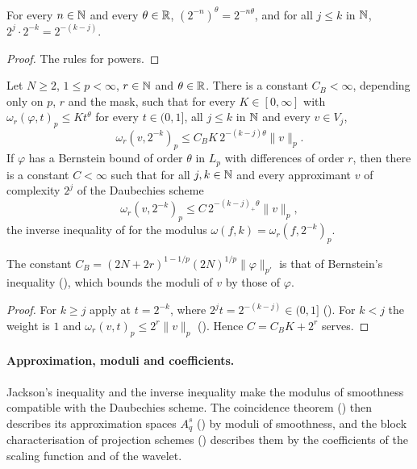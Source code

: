 \begin{lemma}
\label{lem:daub-dyadic-scales}
\leanok
For every $n \in \mathbb{N}$ and every $\theta \in \mathbb{R}$, $(2^{-n})^\theta = 2^{-n\theta}$, and for all
$j \leq k$ in $\mathbb{N}$, $2^j \cdot 2^{-k} = 2^{-(k-j)}$.
\end{lemma}

\begin{proof}
\leanok
The rules for powers.
\end{proof}

\begin{corollary}
\label{cor:daub-inverse}
\leanok
{}
Let $N \geq 2$, $1 \leq p < \infty$, $r \in \mathbb{N}$ and $\theta \in \mathbb{R}$. There is a constant
$C_B < \infty$, depending only on $p$, $r$ and the mask, such that for every $K \in [0, \infty]$
with $\omega_r(\varphi, t)_p \leq K t^\theta$ for every $t \in (0, 1]$, all $j \leq k$ in $\mathbb{N}$
and every $v \in V_j$,
\[
  \omega_r(v, 2^{-k})_p \leq C_B K \, 2^{-(k-j)\theta} \|v\|_p .
\]
If $\varphi$ has a Bernstein bound of order
$\theta$ in $L_p$ with differences of order $r$, then there is a constant $C < \infty$ such that
for all $j, k \in \mathbb{N}$ and every approximant $v$ of complexity $2^j$ of the Daubechies scheme
\[
  \omega_r(v, 2^{-k})_p \leq C \, 2^{-(k-j)_+ \theta} \|v\|_p ,
\]
the inverse inequality of  for the modulus
$\omega(f, k) = \omega_r(f, 2^{-k})_p$.
\end{corollary}

The constant $C_B = (2N + 2r)^{1 - 1/p} (2N)^{1/p} \|\varphi\|_{p'}$ is that of Bernstein's
inequality (), which bounds the moduli of $v$ by those of $\varphi$.

\begin{proof}
\leanok
{}
For $k \geq j$ apply  at $t = 2^{-k}$, where
$2^j t = 2^{-(k-j)} \in (0, 1]$ (). For $k < j$ the weight is $1$
and $\omega_r(v, t)_p \leq 2^r \|v\|_p$ (). Hence $C = C_B K + 2^r$ serves.
\end{proof}

\paragraph{Approximation, moduli and coefficients.}
Jackson's inequality and the inverse inequality make the modulus of smoothness compatible with
the Daubechies scheme. The coincidence theorem () then describes
its approximation spaces $A^s_q$ () by moduli of smoothness, and the block
characterisation of projection schemes () describes them by the coefficients of
the scaling function and of the wavelet.

